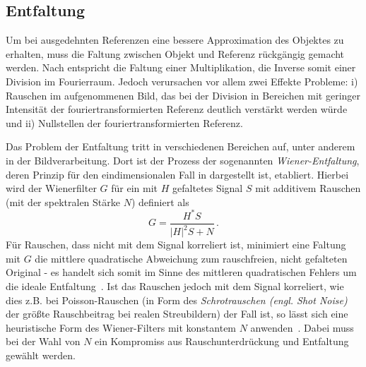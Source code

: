 \subsection{Entfaltung}
Um bei ausgedehnten Referenzen eine bessere Approximation des Objektes zu erhalten, muss die Faltung zwischen Objekt und Referenz rückgängig gemacht werden. Nach  entspricht die Faltung einer Multiplikation, die Inverse somit einer Division im Fourierraum. Jedoch verursachen vor allem zwei Effekte Probleme: i) Rauschen im aufgenommenen Bild, das bei der Division in Bereichen mit geringer Intensität der fouriertransformierten Referenz deutlich verstärkt werden würde und ii) Nullstellen der fouriertransformierten Referenz. 

Das Problem der Entfaltung tritt in verschiedenen Bereichen auf, unter anderem in der Bildverarbeitung.
Dort ist der Prozess der sogenannten \textit{Wiener-Entfaltung}, deren Prinzip für den eindimensionalen Fall in  dargestellt ist, etabliert. Hierbei wird der Wienerfilter $G$ für ein mit $H$ gefaltetes Signal $S$ mit additivem Rauschen (mit der spektralen Stärke $N$) definiert als
\begin{equation}
	G=\frac{H^* S}{\left|H\right|^2 S+N}\,.
\end{equation}
Für Rauschen, dass nicht mit dem Signal korreliert ist, minimiert eine Faltung mit $G$ die mittlere quadratische Abweichung zum rauschfreien, nicht gefalteten Original - es handelt sich somit im Sinne des mittleren quadratischen Fehlers um die ideale Entfaltung~\cite{castleman1996}. Ist das Rauschen jedoch mit dem Signal korreliert, wie dies z.B. bei Poisson-Rauschen (in Form des \textit{Schrotrauschen (engl. Shot Noise)} der größte Rauschbeitrag bei realen Streubildern) der Fall ist, so lässt sich eine heuristische Form des Wiener-Filters mit konstantem $N$ anwenden~\cite{he2004}. Dabei muss bei der Wahl von $N$ ein Kompromiss aus Rauschunterdrückung und Entfaltung gewählt werden.

